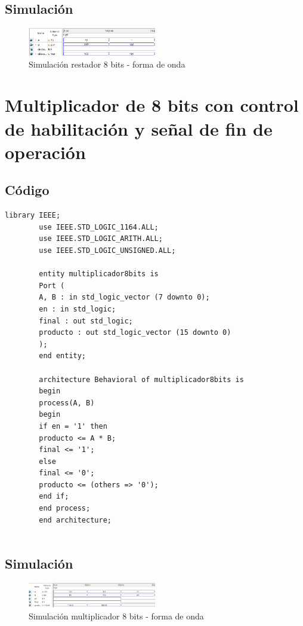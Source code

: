 \documentclass[conference]{IEEEtran}
\begin{document}
	\subsection{Simulación}
	\begin{figure}[h]
		\centering
		\includegraphics[width=0.5\textwidth]{media/restador8bits}
		\caption{Simulación restador 8 bits - forma de onda}
		\label{fig:restador8bits}
	\end{figure}

	\section{Multiplicador de 8 bits con control de habilitación y señal de fin de operación}
	\subsection{Código}
	\begin{lstlisting}[numbers=none]
		library IEEE;
		use IEEE.STD_LOGIC_1164.ALL;
		use IEEE.STD_LOGIC_ARITH.ALL;
		use IEEE.STD_LOGIC_UNSIGNED.ALL;
		
		entity multiplicador8bits is
		Port (
		A, B : in std_logic_vector (7 downto 0);
		en : in std_logic;
		final : out std_logic;
		producto : out std_logic_vector (15 downto 0)
		);
		end entity;
		
		architecture Behavioral of multiplicador8bits is
		begin
		process(A, B)
		begin
		if en = '1' then
		producto <= A * B;
		final <= '1';
		else
		final <= '0';
		producto <= (others => '0');
		end if;
		end process;
		end architecture;
		
	\end{lstlisting}
	\subsection{Simulación}
	\begin{figure}[h]
		\centering
		\includegraphics[width=0.5\textwidth]{media/multiplicador8bits}
		\caption{Simulación multiplicador 8 bits - forma de onda}
		\label{fig:multiplicador8bits}
	\end{figure}
	
\end{document}
